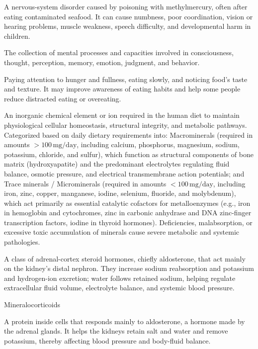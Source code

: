  A nervous-system disorder caused by poisoning with methylmercury, often after eating contaminated seafood. It can cause numbness, poor coordination, vision or hearing problems, muscle weakness, speech difficulty, and developmental harm in children.

 The collection of mental processes and capacities involved in consciousness, thought, perception, memory, emotion, judgment, and behavior.

 Paying attention to hunger and fullness, eating slowly, and noticing food's taste and texture. It may improve awareness of eating habits and help some people reduce distracted eating or overeating.

 An inorganic chemical element or ion required in the human diet to maintain physiological cellular homeostasis, structural integrity, and metabolic pathways. Categorized based on daily dietary requirements into: Macrominerals (required in amounts $>100\,\text{mg/day}$, including calcium, phosphorus, magnesium, sodium, potassium, chloride, and sulfur), which function as structural components of bone matrix (hydroxyapatite) and the predominant electrolytes regulating fluid balance, osmotic pressure, and electrical transmembrane action potentials; and Trace minerals / Microminerals (required in amounts $<100\,\text{mg/day}$, including iron, zinc, copper, manganese, iodine, selenium, fluoride, and molybdenum), which act primarily as essential catalytic cofactors for metalloenzymes (e.g., iron in hemoglobin and cytochromes, zinc in carbonic anhydrase and DNA zinc-finger transcription factors, iodine in thyroid hormones). Deficiencies, malabsorption, or excessive toxic accumulation of minerals cause severe metabolic and systemic pathologies.

 A class of adrenal-cortex steroid hormones, chiefly aldosterone, that act mainly on the kidney's distal nephron. They increase sodium reabsorption and potassium and hydrogen-ion excretion; water follows retained sodium, helping regulate extracellular fluid volume, electrolyte balance, and systemic blood pressure.

\synonyms
Mineralocorticoids

 A protein inside cells that responds mainly to aldosterone, a hormone made by the adrenal glands. It helps the kidneys retain salt and water and remove potassium, thereby affecting blood pressure and body-fluid balance.

